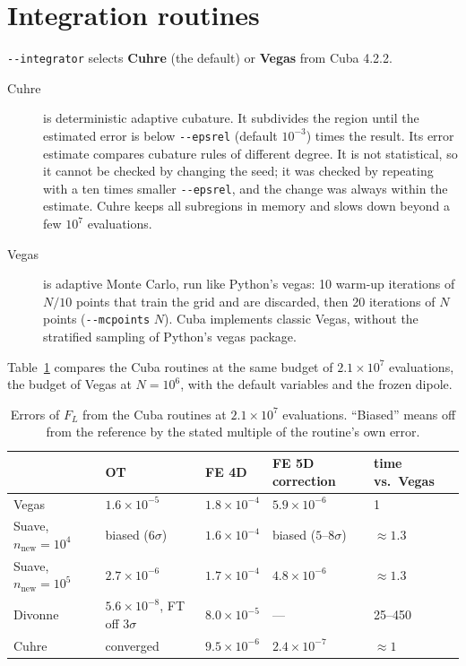 \documentclass[11pt,a4paper]{article}
\newcommand{\opt}[1]{\texttt{-{}-#1}}
\begin{document}
\section{Integration routines}
\label{sec:integrators}

\opt{integrator} selects \textbf{Cuhre} (the default) or \textbf{Vegas} from
Cuba 4.2.2.
\begin{description}
  \item[Cuhre] is deterministic adaptive cubature. It subdivides the region
    until the estimated error is below \opt{epsrel} (default $10^{-3}$) times the
    result. Its error estimate compares cubature rules of different degree. It
    is not statistical, so it cannot be checked by changing the seed; it was
    checked by repeating with a ten times smaller \opt{epsrel}, and the change
    was always within the estimate. Cuhre keeps all subregions in memory and
    slows down beyond a few $10^7$ evaluations.
  \item[Vegas] is adaptive Monte Carlo, run like Python's vegas: 10 warm-up
    iterations of $N/10$ points that train the grid and are discarded, then 20
    iterations of $N$ points (\opt{mcpoints} $N$). Cuba implements classic
    Vegas, without the stratified sampling of Python's vegas package.
\end{description}

Table~\ref{tab:integrators} compares the Cuba routines at the same budget of
$2.1\times10^7$ evaluations, the budget of Vegas at $N = 10^6$, with the
default variables and the frozen dipole.

\begin{table}[ht]
  \centering
  \footnotesize
  \setlength{\tabcolsep}{4pt}
  \begin{tabular}{lllll}
    \toprule
    & OT & FE 4D & FE 5D correction & time vs.\ Vegas \\
    \midrule
    Vegas                  & $1.6\times10^{-5}$ & $1.8\times10^{-4}$ & $5.9\times10^{-6}$ & 1 \\
    Suave, $n_{\text{new}} = 10^4$  & biased ($6\sigma$) & $1.6\times10^{-4}$ & biased ($5$--$8\sigma$) & $\approx 1.3$ \\
    Suave, $n_{\text{new}} = 10^5$  & $2.7\times10^{-6}$ & $1.7\times10^{-4}$ & $4.8\times10^{-6}$ & $\approx 1.3$ \\
    Divonne                & $5.6\times10^{-8}$, FT off $3\sigma$ & $8.0\times10^{-5}$ & --- & 25--450 \\
    Cuhre                  & converged & $9.5\times10^{-6}$ & $2.4\times10^{-7}$ & $\approx 1$ \\
    \bottomrule
  \end{tabular}
  \caption{Errors of $F_L$ from the Cuba routines at $2.1\times10^7$
    evaluations. ``Biased'' means off
    from the reference by the stated multiple of the routine's own error.}
  \label{tab:integrators}
\end{table}
\end{document}
